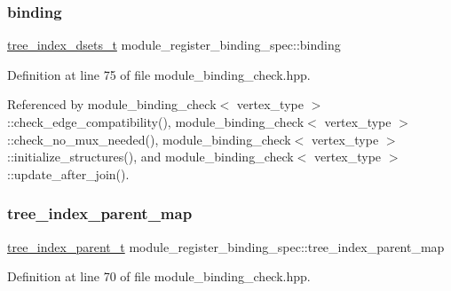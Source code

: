 \subsubsection{\texorpdfstring{binding}{binding}}
{\footnotesize\ttfamily \hyperlink{classmodule__register__binding__spec_a26171ae8c88c4fe1a5397cdd47d417e3}{tree\+\_\+index\+\_\+dsets\+\_\+t} module\+\_\+register\+\_\+binding\+\_\+spec\+::binding}



Definition at line 75 of file module\+\_\+binding\+\_\+check.\+hpp.



Referenced by module\+\_\+binding\+\_\+check$<$ vertex\+\_\+type $>$\+::check\+\_\+edge\+\_\+compatibility(), module\+\_\+binding\+\_\+check$<$ vertex\+\_\+type $>$\+::check\+\_\+no\+\_\+mux\+\_\+needed(), module\+\_\+binding\+\_\+check$<$ vertex\+\_\+type $>$\+::initialize\+\_\+structures(), and module\+\_\+binding\+\_\+check$<$ vertex\+\_\+type $>$\+::update\+\_\+after\+\_\+join().

\mbox{\label{classmodule__register__binding__spec_a66eabfd29036a19cc56ee749e6548bbf}} 
\subsubsection{\texorpdfstring{tree\+\_\+index\+\_\+parent\+\_\+map}{tree\_index\_parent\_map}}
{\footnotesize\ttfamily \hyperlink{classmodule__register__binding__spec_a7caa9258582c53bbbb84194770abe960}{tree\+\_\+index\+\_\+parent\+\_\+t} module\+\_\+register\+\_\+binding\+\_\+spec\+::tree\+\_\+index\+\_\+parent\+\_\+map\hspace{0.3cm}{\ttfamily [private]}}



Definition at line 70 of file module\+\_\+binding\+\_\+check.\+hpp.

\mbox{\label{classmodule__register__binding__spec_aded5834534db10be2a604bc405399bc0}} 
